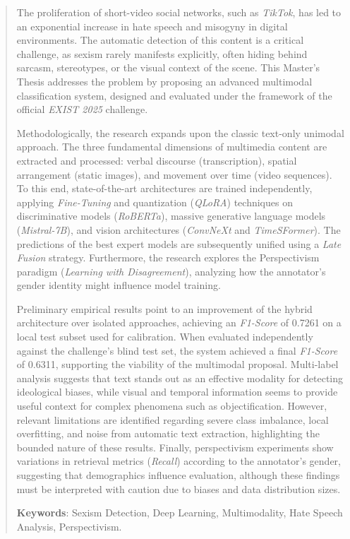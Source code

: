\clearpage

\begin{abstract}
The proliferation of short-video social networks, such as \textit{TikTok}, has led to an exponential increase in hate speech and misogyny in digital environments. The automatic detection of this content is a critical challenge, as sexism rarely manifests explicitly, often hiding behind sarcasm, stereotypes, or the visual context of the scene. This Master's Thesis addresses the problem by proposing an advanced multimodal classification system, designed and evaluated under the framework of the official \textit{EXIST 2025} challenge. 

Methodologically, the research expands upon the classic text-only unimodal approach. The three fundamental dimensions of multimedia content are extracted and processed: verbal discourse (transcription), spatial arrangement (static images), and movement over time (video sequences). To this end, state-of-the-art architectures are trained independently, applying \textit{Fine-Tuning} and quantization (\textit{QLoRA}) techniques on discriminative models (\textit{RoBERTa}), massive generative language models (\textit{Mistral-7B}), and vision architectures (\textit{ConvNeXt} and \textit{TimeSFormer}). The predictions of the best expert models are subsequently unified using a \textit{Late Fusion} strategy. Furthermore, the research explores the Perspectivism paradigm (\textit{Learning with Disagreement}), analyzing how the annotator's gender identity might influence model training. 

Preliminary empirical results point to an improvement of the hybrid architecture over isolated approaches, achieving an \textit{F1-Score} of 0.7261 on a local test subset used for calibration. When evaluated independently against the challenge's blind test set, the system achieved a final \textit{F1-Score} of 0.6311, supporting the viability of the multimodal proposal. Multi-label analysis suggests that text stands out as an effective modality for detecting ideological biases, while visual and temporal information seems to provide useful context for complex phenomena such as objectification. However, relevant limitations are identified regarding severe class imbalance, local overfitting, and noise from automatic text extraction, highlighting the bounded nature of these results. Finally, perspectivism experiments show variations in retrieval metrics (\textit{Recall}) according to the annotator's gender, suggesting that demographics influence evaluation, although these findings must be interpreted with caution due to biases and data distribution sizes.

\bigskip
\noindent\textbf{Keywords}: Sexism Detection, Deep Learning, Multimodality, Hate Speech Analysis, Perspectivism. 
\end{abstract}
